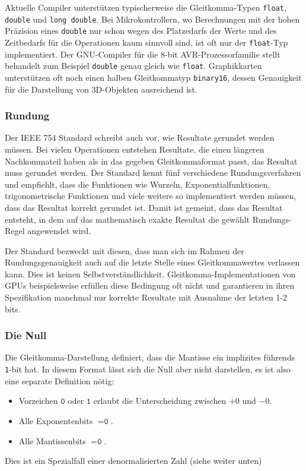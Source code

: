Aktuelle Compiler unterstützen typischerweise die Gleitkomma-Typen
\texttt{float}, \texttt{double} und \texttt{long double}.
Bei Mikrokontrollern, wo Berechnungen mit der hohen Präzision
eines \texttt{double} nur schon wegen des Platzedarfs der Werte
und des Zeitbedarfs für die Operationen kaum sinnvoll sind, ist oft
nur der \texttt{float}-Typ implementiert.
Der GNU-Compiler für die 8-bit AVR-Prozessorfamilie stellt behandelt
zum Beispiel \texttt{double} genau gleich wie \texttt{float}.
Graphikkarten unterstützen oft noch einen halben Gleitkommatyp
\texttt{binary16}, dessen Genauigkeit für die Darstellung von 3D-Objekten
ausreichend ist.

\subsubsection{Rundung}
Der IEEE 754 Standard schreibt auch vor, wie Resultate gerundet werden
müssen.
Bei vielen Operationen entstehen Resultate, die einen längeren 
Nachkommateil haben als in das gegeben Gleitkommaformat passt,
das Resultat muss gerundet werden.
Der Standard kennt fünf verschiedene Rundungsverfahren und empfiehlt,
dass die Funktionen wie Wurzeln, Exponentialfunktionen,
trigonometrische Funktionen und viele weitere so implementiert werden 
müssen, dass das Resultat korrekt gerundet ist.
Damit ist gemeint, dass das Resultat entsteht, in dem auf das
mathematisch exakte Resultat die gewählt Rundungs-Regel angewendet
wird.

Der Standard bezweckt mit diesen, dass man sich im Rahmen der
Rundungsgenauigkeit auch auf die letzte Stelle eines Gleitkommawertes
verlassen kann.
Dies ist keinen Selbstverständlichkeit.
Gleitkomma-Implementationen von GPUs beispielsweise erfüllen diese
Bedingung oft nicht und garantieren in ihren Spezifikation manchmal
nur korrekte Resultate mit Ausnahme der letzten 1-2 bits.

\subsubsection{Die Null}
Die Gleitkomma-Darstellung definiert, dass die Mantisse ein implizites
führends \texttt{1}-bit hat. 
In diesem Format lässt sich die Null aber nicht darstellen, es ist
also eine separate Definition nötig:
\begin{itemize}
\item Vorzeichen $\texttt{0}$ oder $\texttt{1}$ erlaubt die Unterscheidung
zwischen $+0$ und $-0$.
\item Alle Exponentenbits $=\texttt{0}$.
\item Alle Mantissenbits $=\texttt{0}$.
\end{itemize}
Dies ist ein Spezialfall einer denormalisierten Zahl (siehe weiter unten)


